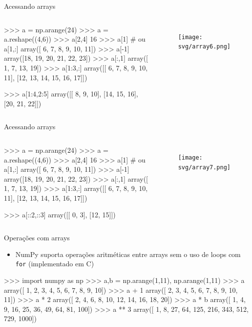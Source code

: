 \documentclass[12pt,t,graphics]{beamer}
\begin{document}
\begin{frame}[t,fragile]{Acessando arrays}
	\vspace{-0.5cm}
	\begin{columns}
		\begin{python}
>>> a = np.arange(24)
>>> a = a.reshape((4,6))
>>> a[2,4]
16
>>> a[1]  # ou a[1,:]
array([ 6,  7,  8,  9, 10, 11])
>>> a[-1]
array([18, 19, 20, 21, 22, 23])
>>> a[:,1]
array([ 1,  7, 13, 19])
>>> a[1:3,:]
array([[ 6,  7,  8,  9, 10, 11],
	[12, 13, 14, 15, 16, 17]])
		
>>> a[1:4,2:5]
array([[ 8,  9, 10],
	   [14, 15, 16],
	   [20, 21, 22]])
		\end{python}
		\begin{figure}
			\centering
			\texttt{[image: svg/array6.png]}
		\end{figure}
	\end{columns}
\end{frame}

\begin{frame}[t,fragile]{Acessando arrays}
	\vspace{-0.5cm}
	\begin{columns}
		\column{.5\textwidth}
		\begin{python}
		>>> a = np.arange(24)
		>>> a = a.reshape((4,6))
		>>> a[2,4]
		16
		>>> a[1]  # ou a[1,:]
		array([ 6,  7,  8,  9, 10, 11])
		>>> a[-1]
		array([18, 19, 20, 21, 22, 23])
		>>> a[:,1]
		array([ 1,  7, 13, 19])
		>>> a[1:3,:]
		array([[ 6,  7,  8,  9, 10, 11],
		[12, 13, 14, 15, 16, 17]])
		
		>>> a[::2,::3]
		array([[ 0,  3],
		[12, 15]])
		\end{python}
		\column{.5\textwidth}
		\begin{figure}
			\centering
			\texttt{[image: svg/array7.png]}
		\end{figure}
	\end{columns}
\end{frame}

\begin{frame}[t,fragile]{Operações com arrays}
	\begin{itemize}
		\item NumPy suporta operações aritméticas entre arrays sem o uso de loops
		com \texttt{for} (implementado em C)
	\end{itemize}
	\begin{python}
	>>> import numpy as np
	>>> a,b = np.arange(1,11), np.arange(1,11)
	>>> a
	array([ 1, 2, 3, 4, 5, 6, 7, 8, 9, 10])
	>>> a + 1
	array([ 2, 3, 4, 5, 6, 7, 8, 9, 10, 11])
	>>> a * 2
	array([ 2, 4, 6, 8, 10, 12, 14, 16, 18, 20])
	>>> a * b
	array([ 1, 4, 9, 16, 25, 36, 49, 64, 81, 100])
	>>> a ** 3
	array([ 1, 8, 27, 64, 125, 216, 343, 512, 729, 1000])
	\end{python}
\end{frame}
\end{document}
